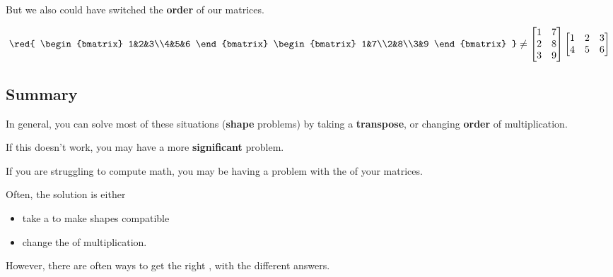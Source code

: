 \begin{itemize}
            But we also could have switched the \textbf{order} of our matrices.
            
            \begin{equation*}
                \red{
                    \begin{bmatrix}
                      1&2&3\\4&5&6
                    \end{bmatrix}
                    \begin{bmatrix}
                      1&7\\2&8\\3&9
                    \end{bmatrix}
                }
                \neq
                    \begin{bmatrix}
                      1&7\\2&8\\3&9
                    \end{bmatrix}
                    \begin{bmatrix}
                      1&2&3\\4&5&6
                    \end{bmatrix}
            \end{equation*}
        \end{itemize}
        
    \subsection*{Summary}
    
        In general, you can solve most of these situations (\textbf{shape} problems) by taking a \textbf{transpose}, or changing \textbf{order} of multiplication.
        
        If this doesn't work, you may have a more \textbf{significant} problem.\\
        
        \begin{concept}
            If you are struggling to compute  math, you may be having a problem with the  of your matrices.
            
            Often, the solution is either
            
            \begin{itemize}
                \item take a  to make shapes compatible
                \item change the  of multiplication.
            \end{itemize}
            
            However, there are often  ways to get the right , with the different answers.
        \end{concept}
        
